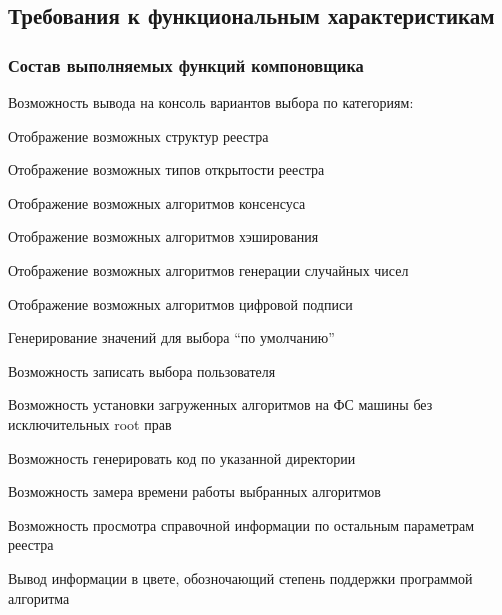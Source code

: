 \subsection{Требования к функциональным характеристикам}
\subsubsection{Состав выполняемых функций компоновщика}
\begin{my_enumerate}
    \item Возможность вывода на консоль вариантов выбора по категориям:
        \begin{my_enumerate}
                \item Отображение возможных структур реестра
                \item Отображение возможных типов открытости реестра
                \item Отображение возможных алгоритмов консенсуса
                \item Отображение возможных алгоритмов хэширования
                \item Отображение возможных алгоритмов генерации случайных чисел
                \item Отображение возможных алгоритмов цифровой подписи
        \end{my_enumerate}
    \item Генерирование значений для выбора ``по умолчанию''
    \item Возможность записать выбора пользователя
    \item Возможность установки загруженных алгоритмов на ФС машины без исключительных root прав
    \item Возможность генерировать код по указанной директории
    \item Возможность замера времени работы выбранных алгоритмов
    \item Возможность просмотра справочной информации по остальным параметрам реестра
    \item Вывод информации в цвете, обозночающий степень поддержки программой алгоритма
\end{my_enumerate}

